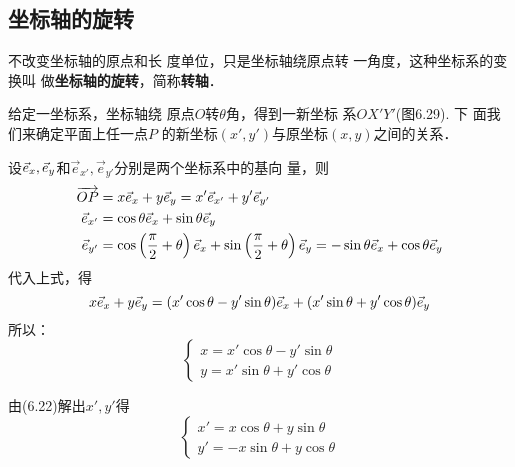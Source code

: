 \subsection{坐标轴的旋转}
不改变坐标轴的原点和长
度单位，只是坐标轴绕原点转
一角度，这种坐标系的变换叫
做\textbf{坐标轴的旋转}，简称\textbf{转轴}．

给定一坐标系，坐标轴绕
原点$O$转$\theta$角，得到一新坐标
系$OX'Y'$(图6.29). 下
面我们来确定平面上任一点$P$
的新坐标$(x',y')$与原坐标$(x,y)$之间的关系．

\begin{figure}[htp]
    \centering
    \caption{}
\end{figure}

设$\vec{e}_x,\vec{e}_y$和$\vec{e}_{x'},\vec{e}_{y'}$分别是两个坐标系中的基向
量，则
\[\begin{split}
    \overrightarrow{OP}&=x\vec{e}_x+y\vec{e}_y=x'\vec{e}_{x'}+y'\vec{e}_{y'}\\
    \vec{e}_{x'}&=\cos\theta \vec{e}_x+\sin\theta\vec{e}_y\\
    \vec{e}_{y'}&=\cos\left(\dfrac{\pi}{2}+\theta\right)\vec{e}_x+\sin\left(\dfrac{\pi}{2}+\theta\right)\vec{e}_y=-\sin\theta\vec{e}_x+\cos\theta\vec{e}_y
\end{split}\]
代入上式，得
\[x\vec{e}_x+y\vec{e}_y=(x'\cos\theta-y'\sin\theta)\vec{e}_x+(x'\sin\theta+y'\cos\theta)\vec{e}_y\]
所以：
\begin{equation}
    \boxed{\begin{cases}
        x=x'\cos\theta-y'\sin\theta\\
        y=x'\sin\theta+y'\cos\theta
    \end{cases}}
\end{equation}

由(6.22)解出$x',y'$得
\begin{equation}
    \boxed{\begin{cases}
        x'=x\cos\theta+y\sin\theta\\
        y'=-x\sin\theta+y\cos\theta
    \end{cases}}
\end{equation}

